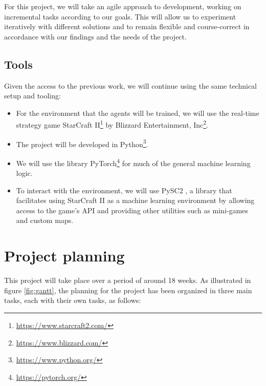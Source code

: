 For this project, we will take an agile approach to development, working on incremental tasks according to our goals. This will allow us to experiment iteratively with different solutions and to remain flexible and course-correct in accordance with our findings and the needs of the project.

\subsection{Tools}
\label{section:tools}

Given the access to the previous work, we will continue using the same technical setup and tooling:

\begin{itemize}
    \item For the environment that the agents will be trained, we will use the real-time strategy game StarCraft II\footnote{\url{https://www.starcraft2.com/}} by Blizzard Entertainment, Inc\footnote{\url{https://www.blizzard.com/}}.
    \item The project will be developed in Python\footnote{\url{https://www.python.org/}}.
    \item We will use the library PyTorch\footnote{\url{https://pytorch.org/}} for much of the general machine learning logic.
    \item To interact with the environment, we will use PySC2 \cite{Vinyals:2017}, a library that facilitates using StarCraft II as a machine learning environment by allowing access to the game's API and providing other utilities such as mini-games and custom maps.
\end{itemize} 

\section{Project planning}

This project will take place over a period of around 18 weeks. As illustrated in figure \ref{fig:gantt}, the planning for the project has been organized in three main tasks, each with their own tasks, as follows:

